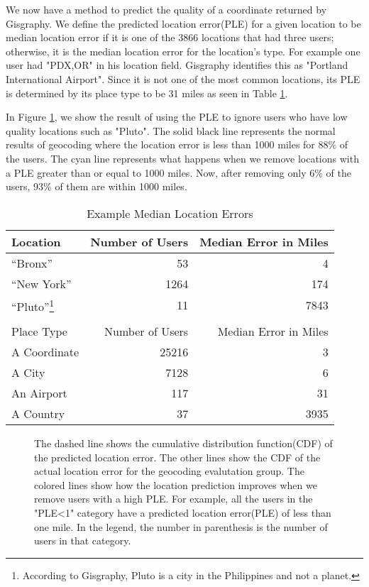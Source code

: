 \documentclass{sig-alternate}
\begin{document}
We now have a method to predict the quality of a coordinate returned by Gisgraphy.
We define the predicted location error(PLE) for a given location to be median location error if it is one of the 3866 locations that had three users; otherwise, it is the median location error for the location's type.
For example one user had "PDX,OR" in his location field. Gisgraphy identifies this as "Portland International Airport". Since it is not one of the most common locations, its PLE is determined by its place type to be 31 miles as seen in Table \ref{tab:MedianLocErr}.

In Figure \ref{fig:DiffGnpGps}, we show the result of using the PLE to ignore users who have low quality locations such as "Pluto".
The solid black line represents the normal results of geocoding where the location error is less than 1000 miles for 88\% of the users.
The cyan line represents what happens when we remove locations with a PLE greater than or equal to 1000 miles. Now, after removing only 6\% of the users, 93\% of them are within 1000 miles.

\begin{table}
\centering
\caption{Example Median Location Errors}
\begin{tabular}{l r r} 
Location&Number of Users&Median Error in Miles\\ \hline
``Bronx''&53&4\\
``New York''&1264&174\\
``Pluto''\footnote{According to Gisgraphy, Pluto is a city in the Philippines and not a planet.}&11&7843\\ \hline
\\
Place Type&Number of Users&Median Error in Miles\\ \hline
A Coordinate&25216&3\\
A City&7128&6\\
An Airport&117&31\\
A Country&37&3935\\
\hline\end{tabular}
\label{tab:MedianLocErr}
\end{table}

\begin{figure}
\centering
{}
\caption{
The dashed line shows the cumulative distribution function(CDF) of the predicted location error.
The other lines show the CDF of the actual location error for the geocoding evalutation group. The colored lines show how the location prediction improves when we remove users with a high PLE. For example, all the users in the "PLE<1" category have a predicted location error(PLE) of less than one mile.
In the legend, the number in parenthesis is the number of users in that category.
}
\label{fig:DiffGnpGps}
\end{figure}
\end{document}
